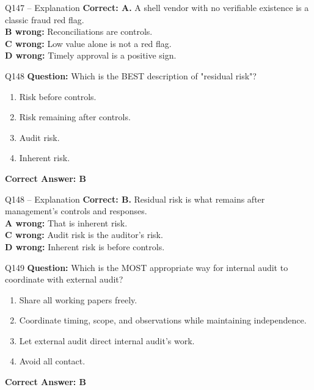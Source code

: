 \documentclass[aspectratio=169,10pt]{beamer}
\begin{document}
	\begin{frame}[t]{Q147 -- Explanation}
		\small
		\textbf{Correct: A.} A shell vendor with no verifiable existence is a classic fraud red flag. \\[4pt]
		\textbf{B wrong:} Reconciliations are controls. \\[2pt]
		\textbf{C wrong:} Low value alone is not a red flag. \\[2pt]
		\textbf{D wrong:} Timely approval is a positive sign.
	\end{frame}
	
	\begin{frame}[t]{Q148}
		\small
		\textbf{Question:} Which is the BEST description of "residual risk"?
		\begin{enumerate}[label=\Alph*.,itemsep=1pt,topsep=2pt]
			\item Risk before controls.
			\item Risk remaining after controls.
			\item Audit risk.
			\item Inherent risk.
		\end{enumerate}
		\vspace{4pt}
		\textbf{Correct Answer: B}
	\end{frame}
	
	\begin{frame}[t]{Q148 -- Explanation}
		\small
		\textbf{Correct: B.} Residual risk is what remains after management's controls and responses. \\[4pt]
		\textbf{A wrong:} That is inherent risk. \\[2pt]
		\textbf{C wrong:} Audit risk is the auditor's risk. \\[2pt]
		\textbf{D wrong:} Inherent risk is before controls.
	\end{frame}
	
	\begin{frame}[t]{Q149}
		\small
		\textbf{Question:} Which is the MOST appropriate way for internal audit to coordinate with external audit?
		\begin{enumerate}[label=\Alph*.,itemsep=1pt,topsep=2pt]
			\item Share all working papers freely.
			\item Coordinate timing, scope, and observations while maintaining independence.
			\item Let external audit direct internal audit's work.
			\item Avoid all contact.
		\end{enumerate}
		\vspace{4pt}
		\textbf{Correct Answer: B}
	\end{frame}
	
\end{document}
